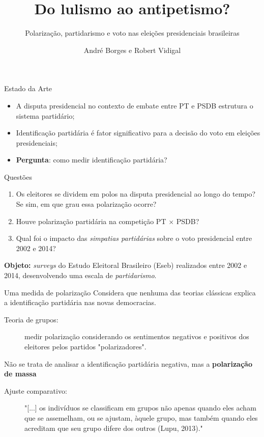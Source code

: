 \documentclass[9pt]{beamer}
\begin{document}
\title{Do lulismo ao antipetismo?}
\subtitle{Polarização, partidarismo e voto nas eleições presidenciais brasileiras}
\author{André Borges e Robert Vidigal}
\date{}

\maketitle

\begin{frame}{Estado da Arte}
    \begin{itemize}
        \item A disputa presidencial no contexto de embate entre PT e PSDB estrutura o sistema partidário; 
        \item Identificação partidária é fator significativo para a decisão do voto em eleições presidenciais;
        \item \textbf{Pergunta}: como medir identificação partidária?
    \end{itemize}
\end{frame}

\begin{frame}{Questões}
    \begin{enumerate}
        \item Os eleitores se dividem em polos na disputa presidencial ao longo do tempo? Se sim, em que grau essa polarização ocorre?
        \item Houve polarização partidária na competição PT $\times$ PSDB?
        \item Qual foi o impacto das \textit{simpatias partidárias} sobre o voto presidencial entre 2002 e 2014?
    \end{enumerate}

\textbf{Objeto:} \textit{surveys} do Estudo Eleitoral Brasileiro (Eseb) realizados entre 2002 e 2014, desenvolvendo uma escala de \textit{partidarismo}.
\end{frame}

\begin{frame}{Uma medida de polarização}
Considera que nenhuma das teorias clássicas explica a identificação partidária nas novas democracias. 
   \begin{description}
       \item[Teoria de grupos:] medir polarização considerando os sentimentos negativos e positivos dos eleitores pelos partidos "polarizadores".
   \end{description}

    Não se trata de analisar a identificação partidária negativa, mas a \textbf{polarização de massa} \cite[~p. 55]{borges}

    \begin{description}
        \item[Ajuste comparativo:] "[...] os indivíduos se classificam em grupos não apenas quando eles acham que se assemelham, ou se ajustam, àquele grupo, mas também quando eles acreditam que seu grupo difere dos outros (Lupu, 2013)." \cite[~p. 57]{borges}
    \end{description}
\end{frame}
\end{document}
